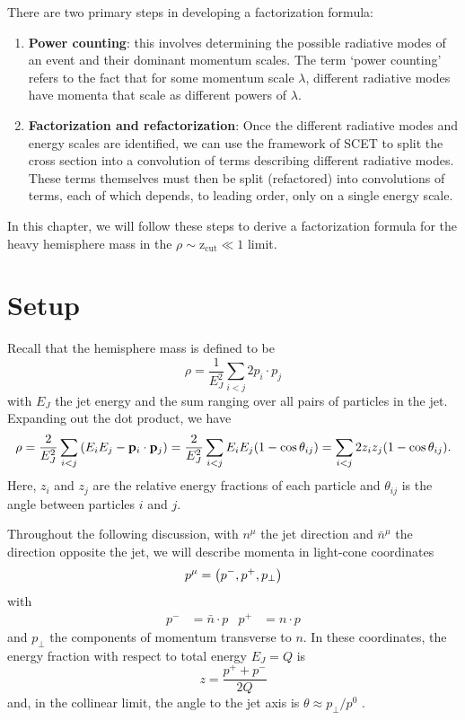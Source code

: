 \documentclass[../thesis.tex]{subfiles}
\providecommand{\zcut}{\mathrm{z_{cut}}}
\begin{document}
	There are two primary steps in developing a factorization formula:
	\begin{enumerate}
		\item \textbf{Power counting}: this involves determining the possible radiative modes of an event and their dominant momentum scales. The term `power counting' refers to the fact that for some momentum scale $\lambda$, different radiative modes have momenta that scale as different powers of $\lambda$.

		\item \textbf{Factorization and refactorization}: Once the different radiative modes and energy scales are identified, we can use the framework of SCET to split the cross section into a convolution of terms describing different radiative modes. These terms themselves must then be split (refactored) into convolutions of terms, each of which depends, to leading order, only on a single energy scale.
	\end{enumerate}
	In this chapter, we will follow these steps to derive a factorization formula for the heavy hemisphere mass in the $\rho \sim \zcut \ll 1$ limit.

\section{Setup}
	Recall that the hemisphere mass is defined to be
	\begin{equation}
		\rho = \frac{1}{E_J^2} \sum_{i<j} 2p_i \cdot p_j
	\end{equation}
	with $E_J$ the jet energy and the sum ranging over all pairs of particles in the jet. Expanding out the dot product, we have
	\begin{equation}\label{factor-eq:jet mass z theta}
		\rho = \frac{2}{E_J^2} \sum_{i<j} \qty(E_i E_j - \vb{p}_i \cdot \vb{p}_j) = \frac{2}{E_J^2} \sum_{i<j} E_i E_j \qty(1 - \cos\theta_{ij}) = \sum_{i<j}2z_i z_j \qty(1 - \cos\theta_{ij}).
	\end{equation}
	Here, $z_i$ and $z_j$ are the relative energy fractions of each particle and $\theta_{ij}$ is the angle between particles $i$ and $j$.

	Throughout the following discussion, with $n^\mu$ the jet direction and $\bar n^\mu$ the direction opposite the jet, we will describe momenta in light-cone coordinates
	\begin{equation}
		p^\mu = \qty(p^-, p^+, p_\perp)
	\end{equation}
	with
	\begin{align}
		p^- &= \bar n \cdot p & p^+ &= n \cdot p
	\end{align}
	and $p_\perp$ the components of momentum transverse to $n$. In these coordinates, the energy fraction with respect to total energy $E_J = Q$ is
	\begin{equation}\label{factor-eq:z light cone coordinates}
		z = \frac{p^+ + p^-}{2Q}
	\end{equation}
	and, in the collinear limit, the angle to the jet axis is $\theta \approx p_\perp / p^0$ \cite{frye_factorization_2016}.
	
\end{document}
